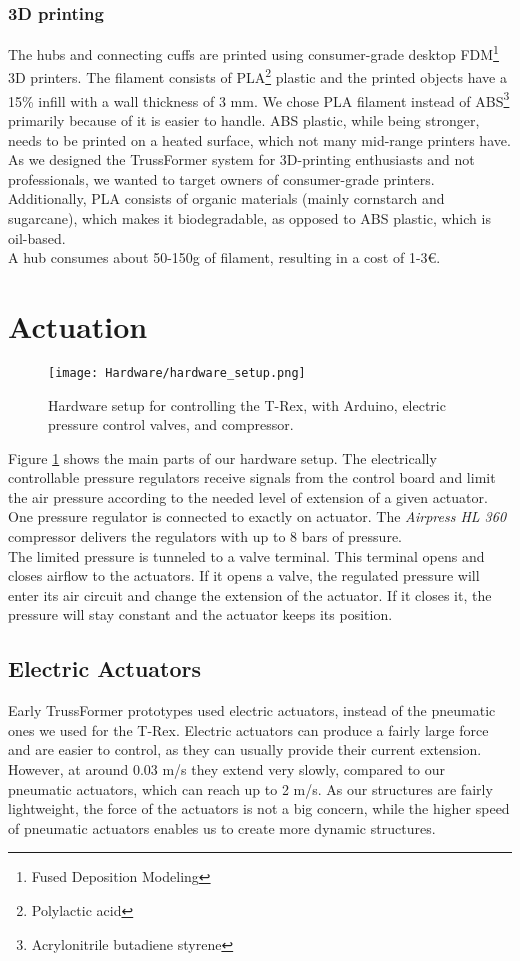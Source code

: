\subsubsection{3D printing}
The hubs and connecting cuffs are printed using consumer-grade desktop FDM\footnote{Fused Deposition Modeling} 3D printers. The filament consists of PLA\footnote{Polylactic acid} plastic and the printed objects have a 15\% infill with a wall thickness of 3 mm. We chose PLA filament instead of ABS\footnote{Acrylonitrile butadiene styrene} primarily because of it is easier to handle. ABS plastic, while being stronger, needs to be printed on a heated surface, which not many mid-range printers have. As we designed the TrussFormer system for 3D-printing enthusiasts and not professionals, we wanted to target owners of consumer-grade printers. Additionally, PLA consists of organic materials (mainly cornstarch and sugarcane), which makes it biodegradable, as opposed to ABS plastic, which is oil-based.\\
A hub consumes about 50-150g of filament, resulting in a cost of 1-3€.

\section{Actuation}
\begin{figure}[h!]
    \texttt{[image: Hardware/hardware\_setup.png]}
    \centering
    \caption{Hardware setup for controlling the T-Rex, with Arduino, electric pressure control valves, and compressor.}
    \label{fig:hardware_setup}
\end{figure}
Figure \ref{fig:hardware_setup} shows the main parts of our hardware setup. The electrically controllable pressure regulators receive signals from the control board and limit the air pressure according to the needed level of extension of a given actuator. One pressure regulator is connected to exactly on actuator. The \textit{Airpress HL 360} compressor delivers the regulators with up to 8 bars of pressure.\\
The limited pressure is tunneled to a valve terminal. This terminal opens and closes airflow to the actuators. If it opens a valve, the regulated pressure will enter its air circuit and change the extension of the actuator. If it closes it, the pressure will stay constant and the actuator keeps its position.

\subsection{Electric Actuators}
Early TrussFormer prototypes used electric actuators, instead of the pneumatic ones we used for the T-Rex. Electric actuators can produce a fairly large force and are easier to control, as they can usually provide their current extension. However, at around 0.03 m/s they extend very slowly, compared to our pneumatic actuators, which can reach up to 2 m/s. As our structures are fairly lightweight, the force of the actuators is not a big concern, while the higher speed of pneumatic actuators enables us to create more dynamic structures.

